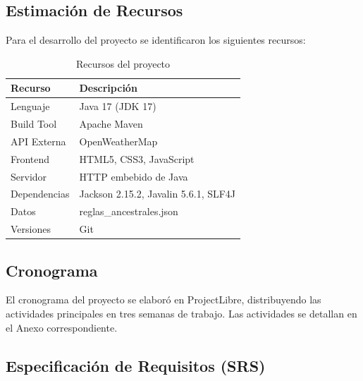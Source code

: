 \documentclass[conference]{IEEEtran}
\begin{document}

\subsection{Estimación de Recursos}

Para el desarrollo del proyecto se identificaron los siguientes recursos:

\begin{table}[H]
    \centering
    \caption{Recursos del proyecto}
    \label{tab:recursos}
    \begin{tabularx}{\columnwidth}{|l|X|}
        \hline
        \textbf{Recurso} & \textbf{Descripción} \\
        \hline
        Lenguaje & Java 17 (JDK 17) \\
        \hline
        Build Tool & Apache Maven \\
        \hline
        API Externa & OpenWeatherMap \\
        \hline
        Frontend & HTML5, CSS3, JavaScript \\
        \hline
        Servidor & HTTP embebido de Java \\
        \hline
        Dependencias & Jackson 2.15.2, Javalin 5.6.1, SLF4J \\
        \hline
        Datos & reglas\_ancestrales.json \\
        \hline
        Versiones & Git \\
        \hline
    \end{tabularx}
\end{table}

\subsection{Cronograma}


El cronograma del proyecto se elaboró en ProjectLibre, distribuyendo las actividades principales en tres semanas de trabajo. Las actividades se detallan en el Anexo correspondiente.

\subsection{Especificación de Requisitos (SRS)}
\end{document}
